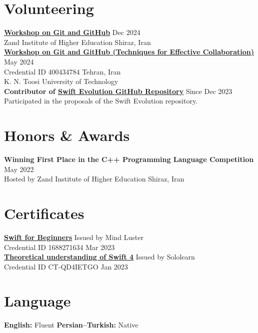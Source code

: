 \documentclass[letter,10pt]{article}
\begin{document}
\section*{Volunteering}
\href{https://github.com/karami-mehdi/CV/blob/main/Assets/certificate-of-workshop-participation-karami-mehdi-zand-ihe.pdf}{\underline{\textbf{Workshop on Git and GitHub}}} \hfill Dec 2024 \\ [2pt]
Zand Institute of Higher Education \hfill Shiraz, Iran \\ [5pt]
\href{https://github.com/karami-mehdi/CV/blob/main/Assets/certificate-of-workshop-participation-karami-mehdi.pdf}{\underline{\textbf{Workshop on Git and GitHub (Techniques for Effective Collaboration)}}} \hfill May 2024 \\ [2pt]
Credential ID 400434784 \hfill Tehran, Iran \\ 
K. N. Toosi University of Technology \\ [5pt]
\textbf{Contributor of \href{https://github.com/swiftlang/swift-evolution}{\underline{\textbf{Swift Evolution GitHub Repository}}}} \hfill Since Dec 2023 \\ [2pt]
Participated in the proposals of the Swift Evolution repository.

\section*{Honors \& Awards}
\noindent
\textbf{Winning First Place in the C++ Programming Language Competition} \hfill May 2022 \\
Hosted by Zand Institute of Higher Education \hfill Shiraz, Iran

\section*{Certificates}
\noindent
\href{https://www.mindluster.com/storage/cer/1688271634.jpg}{\underline{\textbf{Swift for Beginners}}} \hfill Issued by Mind Luster \\ [2pt]
Credential ID 1688271634 \hfill Mar 2023 \\ [5pt]
\href{https://www.sololearn.com/certificate/CT-QD4IETGO/png}{\underline{\textbf{Theoretical understanding of Swift 4}}} \hfill Issued by Sololearn \\ [2pt]
Credential ID CT-QD4IETGO \hfill Jan 2023

\section*{Language}
\noindent
\textbf{English:} Fluent \hspace{2em} 
\textbf{Persian–Turkish:} Native
\end{document}
